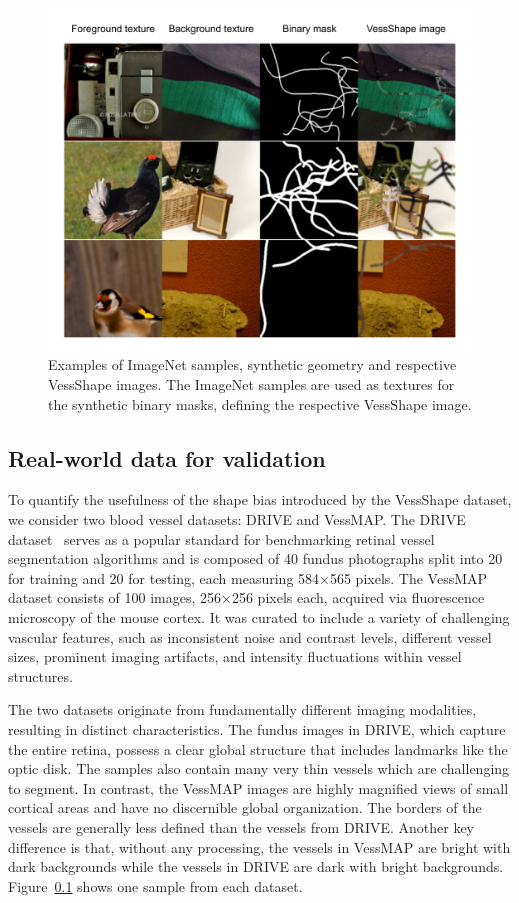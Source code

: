 \documentclass[%
reprint,
nofootinbib,
 amsmath,amssymb,
aps,
superscriptaddress,
showkeys,
longbibliography
]{revtex4-1}
\begin{document}
\begin{figure}[tbp]
    \centering
    \includegraphics[width=\columnwidth]{figures/results/vessshape_sample.pdf}
    \caption{Examples of ImageNet samples, synthetic geometry and respective VessShape images. The ImageNet samples are used as textures for the synthetic binary masks, defining the respective VessShape image.}
    \label{f:vessshape_sample}
\end{figure}

\subsection{Real-world data for validation}

To quantify the usefulness of the shape bias introduced by the VessShape dataset, we consider two blood vessel datasets: DRIVE and VessMAP. The DRIVE dataset~\cite{} serves as a popular standard for benchmarking retinal vessel segmentation algorithms and is composed of 40 fundus photographs split into 20 for training and 20 for testing, each measuring 584×565 pixels. The VessMAP dataset consists of 100 images, 256×256 pixels each, acquired via fluorescence microscopy of the mouse cortex. It was curated to include a variety of challenging vascular features, such as inconsistent noise and contrast levels, different vessel sizes, prominent imaging artifacts, and intensity fluctuations within vessel structures.

The two datasets originate from fundamentally different imaging modalities, resulting in distinct characteristics. The fundus images in DRIVE, which capture the entire retina, possess a clear global structure that includes landmarks like the optic disk. The samples also contain many very thin vessels which are challenging to segment. In contrast, the VessMAP images are highly magnified views of small cortical areas and have no discernible global organization. The borders of the vessels are generally less defined than the vessels from DRIVE. Another key difference is that, without any processing, the vessels in VessMAP are bright with dark backgrounds while the vessels in DRIVE are dark with bright backgrounds. Figure~\ref{} shows one sample from each dataset.
\end{document}

